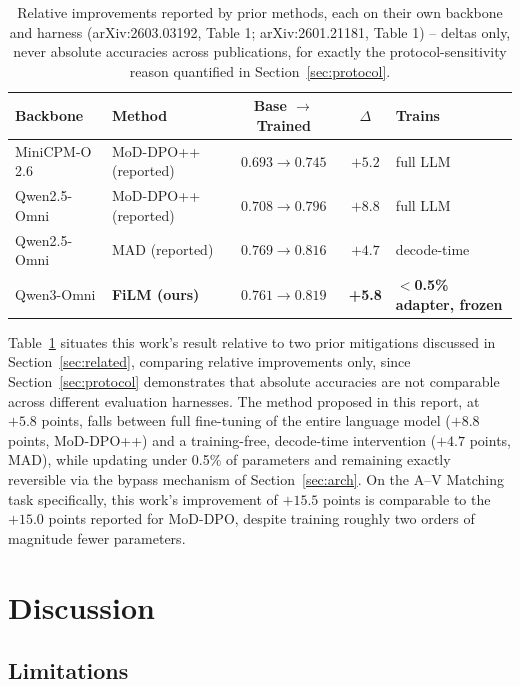 \documentclass[11pt,a4paper,oneside]{article}
\begin{document}
\begin{table}[h]
\centering
\small
\begin{tabular}{llccl}
\toprule
Backbone & Method & Base $\to$ Trained & $\Delta$ & Trains \\
\midrule
MiniCPM-O 2.6 & MoD-DPO++ (reported) & $0.693\to0.745$ & $+5.2$ & \textcolor{red!70!black}{full LLM} \\
Qwen2.5-Omni  & MoD-DPO++ (reported) & $0.708\to0.796$ & $+8.8$ & \textcolor{red!70!black}{full LLM} \\
Qwen2.5-Omni  & MAD (reported)       & $0.769\to0.816$ & $+4.7$ & \textcolor{frz}{decode-time} \\
\midrule
Qwen3-Omni    & \textbf{FiLM (ours)} & $0.761\to0.819$ & \textbf{+5.8} & \textcolor{trn}{\textbf{$<$0.5\% adapter, frozen}} \\
\bottomrule
\end{tabular}
\caption{Relative improvements reported by prior methods, each on their own backbone and harness
(arXiv:2603.03192, Table 1; arXiv:2601.21181, Table 1) -- deltas only, never absolute accuracies
across publications, for exactly the protocol-sensitivity reason quantified in
Section~\ref{sec:protocol}.}
\label{tab:prior}
\end{table}

Table~\ref{tab:prior} situates this work's result relative to two prior mitigations discussed in
Section~\ref{sec:related}, comparing relative improvements only, since Section~\ref{sec:protocol}
demonstrates that absolute accuracies are not comparable across different evaluation harnesses. The
method proposed in this report, at $+5.8$ points, falls between full fine-tuning of the entire
language model ($+8.8$ points, MoD-DPO++) and a training-free, decode-time intervention ($+4.7$
points, MAD), while updating under 0.5\% of parameters and remaining exactly reversible via the
bypass mechanism of Section~\ref{sec:arch}. On the A--V Matching task specifically, this work's
improvement of $+15.5$ points is comparable to the $+15.0$ points reported for MoD-DPO, despite
training roughly two orders of magnitude fewer parameters.

\clearpage
\section{Discussion}
\label{sec:discussion}

\subsection{Limitations}
\label{sec:limitations}
\end{document}
